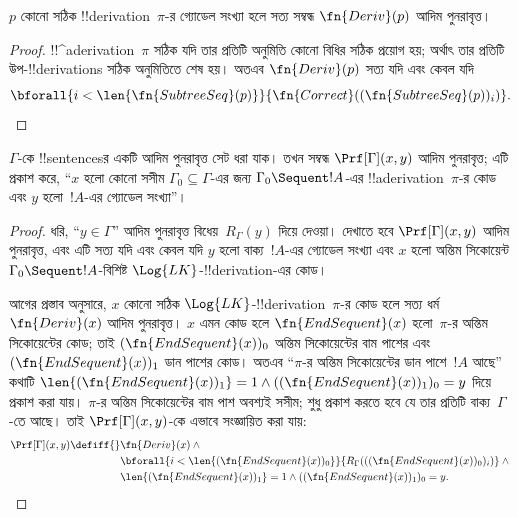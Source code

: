 \documentclass[../../../include/open-logic-section]{subfiles}
\begin{document}
\begin{prop}
  $p$ কোনো সঠিক !!{derivation}~$\pi$-র গ্যোডেল সংখ্যা হলে সত্য সম্বন্ধ
  $\fn{Deriv}(p)$ আদিম পুনরাবৃত্ত।
\end{prop}

\begin{proof}
  !!^a{derivation}~$\pi$ সঠিক যদি তার প্রতিটি অনুমিতি কোনো বিধির সঠিক প্রয়োগ
  হয়; অর্থাৎ তার প্রতিটি উপ-!!{derivation}s সঠিক অনুমিতিতে শেষ হয়। অতএব
  $\fn{Deriv}(p)$ সত্য যদি এবং কেবল যদি
  \[
  \bforall{i<\len{\fn{SubtreeSeq}(p)}}{\fn{Correct}((\fn{SubtreeSeq}(p))_i)}.
  \]
\end{proof}

\begin{prop}
$\Gamma$-কে !!{sentence}sর একটি আদিম পুনরাবৃত্ত সেট ধরা যাক। তখন
সম্বন্ধ $\Prf[\Gamma](x, y)$ আদিম পুনরাবৃত্ত; এটি প্রকাশ করে, ``$x$ হলো
কোনো সসীম $\Gamma_0 \subseteq \Gamma$-এর জন্য
$\Gamma_0 \Sequent !A$-এর !!a{derivation}~$\pi$-র কোড এবং $y$ হলো~$!A$-এর
গ্যোডেল সংখ্যা''।
\end{prop}

\begin{proof}
ধরি, ``$y \in \Gamma$'' আদিম পুনরাবৃত্ত বিধেয়~$R_\Gamma(y)$ দিয়ে দেওয়া।
দেখাতে হবে $\Prf[\Gamma](x, y)$ আদিম পুনরাবৃত্ত, এবং এটি সত্য যদি এবং কেবল
যদি $y$ হলো বাক্য~$!A$-এর গ্যোডেল
সংখ্যা এবং $x$ হলো অন্তিম সিকোয়েন্ট $\Gamma_0 \Sequent !A$-বিশিষ্ট
$\Log{LK}$-!!{derivation}-এর কোড।

আগের প্রস্তাব অনুসারে, $x$ কোনো সঠিক $\Log{LK}$-!!{derivation}~$\pi$-র কোড
হলে সত্য ধর্ম $\fn{Deriv}(x)$ আদিম পুনরাবৃত্ত। $x$ এমন কোড হলে
$\fn{EndSequent}(x)$ হলো~$\pi$-র অন্তিম সিকোয়েন্টের কোড; তাই
$(\fn{EndSequent}(x))_0$ অন্তিম সিকোয়েন্টের বাম পাশের এবং
$(\fn{EndSequent}(x))_1$ ডান পাশের কোড। অতএব ``$\pi$-র অন্তিম সিকোয়েন্টের
ডান পাশে~$!A$ আছে'' কথাটি
$\len{(\fn{EndSequent}(x))_1} = 1 \land ((\fn{EndSequent}(x))_1)_0 = y$
দিয়ে প্রকাশ করা যায়। $\pi$-র অন্তিম সিকোয়েন্টের বাম পাশ অবশ্যই সসীম;
শুধু প্রকাশ করতে হবে যে তার প্রতিটি বাক্য~$\Gamma$-তে আছে। তাই
$\Prf[\Gamma](x, y)$-কে এভাবে সংজ্ঞায়িত করা যায়:
\begin{align*}
\Prf[\Gamma](x, y) \defiff {}&
\fn{Deriv}(x) \land {} \\
& \bforall{i <
  \len{(\fn{EndSequent}(x))_0}}{R_\Gamma(((\fn{EndSequent}(x))_0)_i)} \land {}\\
& \len{(\fn{EndSequent}(x))_1} = 1 \land ((\fn{EndSequent}(x))_1)_0 = y.
\end{align*}
\end{proof}
\end{document}
